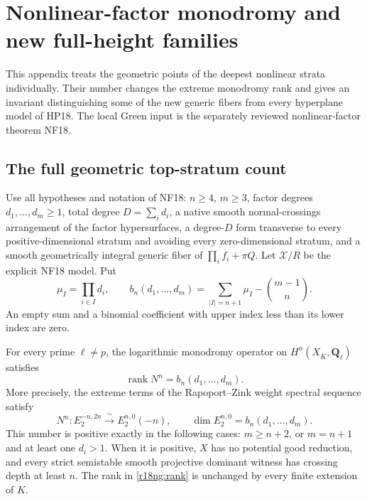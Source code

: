 \section{Nonlinear-factor monodromy and new full-height families}
\label{r18ng:section}

This appendix treats the geometric points of the deepest
nonlinear strata individually.  Their number changes the
extreme monodromy rank and gives an invariant distinguishing
some of the new generic fibers from every hyperplane model
of HP18.  The local Green input is the separately reviewed
nonlinear-factor theorem NF18.

\subsection{The full geometric top-stratum count}

Use all hypotheses and notation of NF18: $n\ge4$, $m\ge3$,
factor degrees $d_1,\ldots,d_m\ge1$, total degree
$D=\sum_i d_i$, a native smooth normal-crossings arrangement
of the factor hypersurfaces, a degree-$D$ form transverse
to every positive-dimensional stratum and avoiding every
zero-dimensional stratum, and a smooth geometrically
integral generic fiber of $\prod_i f_i+\pi Q$.
Let $\mathcal X/R$ be the explicit NF18 model.
Put
\[
 \mu_I=\prod_{i\in I}d_i,\qquad
 b_n(d_1,\ldots,d_m)
   =\sum_{|I|=n+1}\mu_I-\binom{m-1}{n}.
 \tag{NG18.1}\label{r18ng:rank-number}
\]
An empty sum and a binomial coefficient with upper index
less than its lower index are zero.

\begin{theorem}
\label{r18ng:monodromy}
For every prime $\ell\ne p$, the logarithmic monodromy
operator on $H^n(X_{\overline K},\mathbf Q_\ell)$ satisfies
\[
 \operatorname{rank}N^n=b_n(d_1,\ldots,d_m).
 \tag{NG18.2}\label{r18ng:rank}
\]
More precisely, the extreme terms of the Rapoport--Zink
weight spectral sequence satisfy
\[
 N^n:E_2^{-n,2n}\xrightarrow{\ \sim\ }E_2^{n,0}(-n),
 \qquad
 \dim E_2^{n,0}=b_n(d_1,\ldots,d_m).
 \tag{NG18.3}\label{r18ng:extreme}
\]
This number is positive exactly in the following cases:
$m\ge n+2$, or $m=n+1$ and at least one $d_i>1$.
When it is positive, $X$ has no potential good reduction,
and every strict semistable smooth projective dominant
witness has crossing depth at least $n$.
The rank in \eqref{r18ng:rank} is unchanged by every finite
extension of $K$.
\end{theorem}


